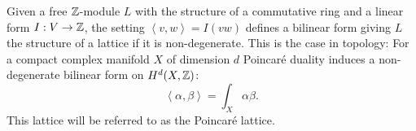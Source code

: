 \begin{example}
Given a free $\mathbb{Z}$-module $L$ with the structure of a commutative ring and a linear form $I:V\rightarrow \mathbb{Z}$, the setting $\left<v,w\right>=I(vw)$ defines a bilinear form giving $L$ the structure of a lattice if it is non-degenerate. This is the case in topology:
For a compact complex manifold $X$ of dimension $d$ Poincar\'e duality induces a non-degenerate bilinear form on $H^d(X,\mathbb{Z})$: $$\left<\alpha,\beta\right> = \int_X\alpha\beta.$$ 
This lattice will be referred to as the Poincar\'e lattice.
\end{example}